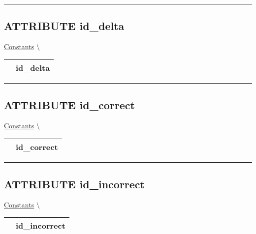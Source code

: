\par


\rule{\linewidth}{0.5pt}
\subsection*{\textsf{\colorbox{headtoc}{\color{white} ATTRIBUTE}
id\_delta}}

\hypertarget{ecldoc:constants.id_delta}{}
\hspace{0pt} \hyperlink{ecldoc:Constants}{Constants} \textbackslash 

{\renewcommand{\arraystretch}{1.5}
\begin{tabularx}{\textwidth}{|>{\raggedright\arraybackslash}l|X|}
\hline
\hspace{0pt}\mytexttt{\color{red} } & \textbf{id\_delta} \\
\hline
\end{tabularx}
}

\par


\rule{\linewidth}{0.5pt}
\subsection*{\textsf{\colorbox{headtoc}{\color{white} ATTRIBUTE}
id\_correct}}

\hypertarget{ecldoc:constants.id_correct}{}
\hspace{0pt} \hyperlink{ecldoc:Constants}{Constants} \textbackslash 

{\renewcommand{\arraystretch}{1.5}
\begin{tabularx}{\textwidth}{|>{\raggedright\arraybackslash}l|X|}
\hline
\hspace{0pt}\mytexttt{\color{red} } & \textbf{id\_correct} \\
\hline
\end{tabularx}
}

\par


\rule{\linewidth}{0.5pt}
\subsection*{\textsf{\colorbox{headtoc}{\color{white} ATTRIBUTE}
id\_incorrect}}

\hypertarget{ecldoc:constants.id_incorrect}{}
\hspace{0pt} \hyperlink{ecldoc:Constants}{Constants} \textbackslash 

{\renewcommand{\arraystretch}{1.5}
\begin{tabularx}{\textwidth}{|>{\raggedright\arraybackslash}l|X|}
\hline
\hspace{0pt}\mytexttt{\color{red} } & \textbf{id\_incorrect} \\
\hline
\end{tabularx}
}

